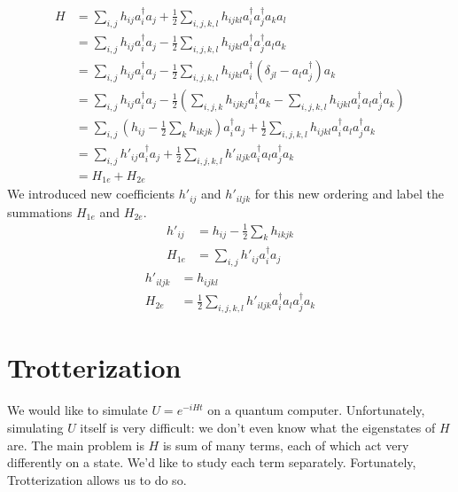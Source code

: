 \begin{equation}
    \begin{split}
        H &= \sum_{i, j} h_{ij}a^\dag_ia_j + \frac{1}{2}\sum_{i,j,k,l} h_{ijkl}a^\dag_ia^\dag_ja_ka_l \\
        &= \sum_{i, j} h_{ij}a^\dag_ia_j - \frac{1}{2}\sum_{i,j,k,l} h_{ijkl}a^\dag_ia^\dag_ja_la_k \\
        &= \sum_{i, j} h_{ij}a^\dag_ia_j - \frac{1}{2}\sum_{i,j,k,l} h_{ijkl}a^\dag_i(\delta_{jl} - a_la^\dag_j)a_k \\
        &= \sum_{i, j} h_{ij}a^\dag_ia_j - \frac{1}{2}\left(\sum_{i, j, k}h_{ijkj}a^\dag_ia_k - \sum_{i,j,k,l} h_{ijkl}a^\dag_ia_la^\dag_ja_k\right) \\
        &= \sum_{i, j} (h_{ij} - \frac{1}{2}\sum_k h_{ikjk})a^\dag_ia_j + \frac{1}{2}\sum_{i,j,k,l} h_{ijkl}a^\dag_ia_la^\dag_ja_k \\
        &= \sum_{i, j} h'_{ij}a^\dag_ia_j + \frac{1}{2}\sum_{i,j,k,l} h'_{iljk}a^\dag_ia_la^\dag_ja_k \\
        &= H_{1e} + H_{2e}
    \end{split}
    \label{eq: H3}
\end{equation}
We introduced new coefficients $h'_{ij}$ and $h'_{iljk}$ for this new ordering and label the summations $H_{1e}$ and $H_{2e}$.
\begin{equation}
    \begin{split}
        h'_{ij} &= h_{ij} - \frac{1}{2}\sum_k h_{ikjk} \\
        H_{1e} &= \sum_{i, j} h'_{ij}a^\dag_ia_j \label{eq: H1}
    \end{split}
\end{equation}
\begin{equation}
    \begin{split}
        h'_{iljk} &= h_{ijkl} \\
        H_{2e} &= \frac{1}{2}\sum_{i,j,k,l} h'_{iljk}a^\dag_ia_la^\dag_ja_k \label{eq: H2}
    \end{split}
\end{equation}

\section{Trotterization}

We would like to simulate $U = e^{-iHt}$ on a quantum computer. Unfortunately, simulating $U$ itself is very difficult: we don't even know what the eigenstates of $H$ are. The main problem is $H$ is sum of many terms, each of which act very differently on a state. We'd like to study each term separately. Fortunately, Trotterization allows us to do so.

